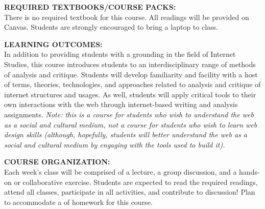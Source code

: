 \documentclass[10pt]{article}
\begin{document}

\textbf{REQUIRED TEXTBOOKS/COURSE PACKS:}\\
There is no required textbook for this course. All readings will be provided on Canvas. Students are strongly encouraged to bring a laptop to class. 

\textbf{LEARNING OUTCOMES:}\\
In addition to providing students with a grounding in the field of Internet Studies, this course introduces students to an interdisciplinary range of methods of analysis and critique. Students will develop familiarity and facility with a host of terms, theories, technologies, and approaches related to analysis and critique of internet structures and usages. As well, students will apply critical tools to their own interactions with the web through internet-based writing and analysis assignments. \textit{Note: this is a course for students who wish to understand the web as a social and cultural medium, not a course for students who wish to learn web design skills (although, hopefully, students will better understand the web as a social and cultural medium by engaging with the tools used to build it).} 

\textbf{COURSE ORGANIZATION:}\\
Each week's class will be comprised of a lecture, a group discussion, and a hands-on or collaborative exercise. Students are expected to read the required readings, attend all classes, participate in all activities, and contribute to discussion! Plan to accommodate a \underline{} of homework for this course. 
\end{document}
